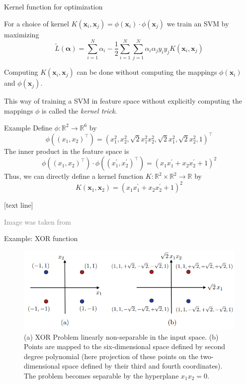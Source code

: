 \documentclass[dvipsnames]{beamer}
\newcommand{\referencefootnote}[1]{\setbeamertemplate{footline}[text line]{%
\parbox{0.9\paperwidth}{\vspace*{-23pt}\tiny{\textcolor{gray}{#1}}\hfill\scriptsize\insertframenumber}}}
\begin{document}
			\begin{frame}{Kernel function for optimization}
			
			For a choice of kernel $K(\mathbf{x}_i,\mathbf{x}_j) = \phi(\mathbf{x}_i)\cdot \phi(\mathbf{x}_j)$ we train an SVM by maximizing
       			\[
			\widetilde{L}(\boldsymbol{\alpha}) = \sum_{i=1}^N\alpha_i - \frac{1}{2}\sum_{i=1}^N\sum_{j=1}^N\alpha_i\alpha_j y_i y_j K(\mathbf{x}_i,\mathbf{x}_j)
			\]
			
			Computing $K(\mathbf{x}_i,\mathbf{x}_j)$ can be done without computing the mappings $\phi(\mathbf{x}_i)$ and $\phi(\mathbf{x}_j)$.
			
			This way of training a SVM in feature space without explicitly computing the mappings $\phi$ is called the \emph{kernel trick}. 
			\end{frame}
			
			\begin{frame}{Example}
        Define $\phi:\mathbb{R}^2 \rightarrow \mathbb{R}^6$ by
				\[
				\phi((x_1,x_2)^{\top}) = (x_1^2,x_2^2,\sqrt{2}x_1^2 x_2^2, \sqrt{2}x_1^2,\sqrt{2}x_2^2, 1)^{\top}
				\]
				The inner product in the feature space is
				\[
				\phi((x_1,x_2)^{\top})\cdot \phi((x^{'}_1,x^{'}_2)^{\top}) = (x_1 x_1^{'} + x_2 x_2^{'}+ 1)^2
				\]
				Thus, we can directly define a kernel function $K:\mathbb{R}^2 \times \mathbb{R}^2 \rightarrow \mathbb{R}$ by
				\[
				K(\mathbf{x}_1,\mathbf{x}_2) = (x_1 x_1^{'} + x_2 x_2^{'}+ 1)^2
				\]
			\end{frame}
			
			{ \referencefootnote{Image was taken from \cite{mohri_fom}}
			\begin{frame}{Example: XOR function}
        \begin{figure}
					\center
					\includegraphics[scale=.5]{figures/xor.png}
           \caption{(a) XOR Problem linearly non-separable in the input space. (b) Points are mapped to the six-dimensional space defined by second degree polynomial (here projection of these points on the two-dimensional space defined by their third and fourth coordinates). The problem becomes separable by the hyperplane $x_1x_2 = 0$.}
        \end{figure}
			\end{frame}
			}
			
\end{document}
